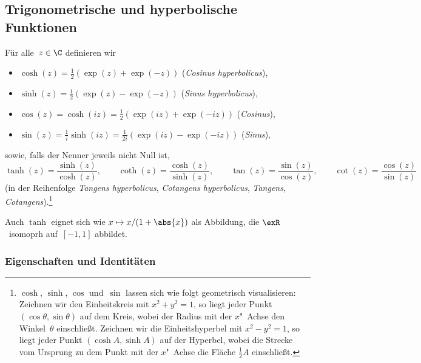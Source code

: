 \documentclass[a4paper]{article}
\begin{document}
\subsection{Trigonometrische und hyperbolische Funktionen}

\begin{definition}
    Für alle~$z \in \C$ definieren wir
    \begin{itemize}
        \item $\cosh(z) = \frac{1}{2}(\exp(z)+\exp(-z))$ (\emph{Cosinus hyperbolicus}),
        \item $\sinh(z) = \frac{1}{2}(\exp(z)-\exp(-z))$ (\emph{Sinus hyperbolicus}),
        \item $\cos(z) = \cosh(iz) = \frac{1}{2}(\exp(iz)+\exp(-iz))$ (\emph{Cosinus}),
        \item $\sin(z) = \frac{1}{i}\sinh(iz) = \frac{1}{2i}(\exp(iz)-\exp(-iz))$ (\emph{Sinus}),
    \end{itemize}
    sowie, falls der Nenner jeweils nicht Null ist,
    \begin{equation*}
        \tanh(z) = \frac{\sinh(z)}{\cosh(z)}, \qquad \coth(z) = \frac{\cosh(z)}{\sinh(z)}, \qquad \tan(z) = \frac{\sin(z)}{\cos(z)}, \qquad \cot(z) = \frac{\cos(z)}{\sin(z)}
    \end{equation*}
    (in der Reihenfolge \emph{Tangens hyperbolicus}, \emph{Cotangens hyperbolicus}, \emph{Tangens}, \emph{Cotangens}).\footnote{$\cosh$, $\sinh$, $\cos$ und~$\sin$ lassen sich wie folgt geometrisch visualisieren: Zeichnen wir den Einheitskreis mit $x^2+y^2 = 1$, so liegt jeder Punkt $(\cos\theta,\sin\theta)$ auf dem Kreis, wobei der Radius mit der $x$"~Achse den Winkel~$\theta$ einschließt. Zeichnen wir die Einheitshyperbel mit $x^2-y^2 = 1$, so liegt jeder Punkt $(\cosh A,\sinh A)$ auf der Hyperbel, wobei die Strecke vom Ursprung zu dem Punkt mit der $x$"~Achse die Fläche $\frac{1}{2}A$ einschließt.}
\end{definition}

Auch $\tanh$ eignet sich wie $x \mapsto x/(1+\abs{x})$ als Abbildung, die $\exR$~isomoprh auf~$[-1,1]$ abbildet.

\subsubsection{Eigenschaften und Identitäten}
\end{document}
